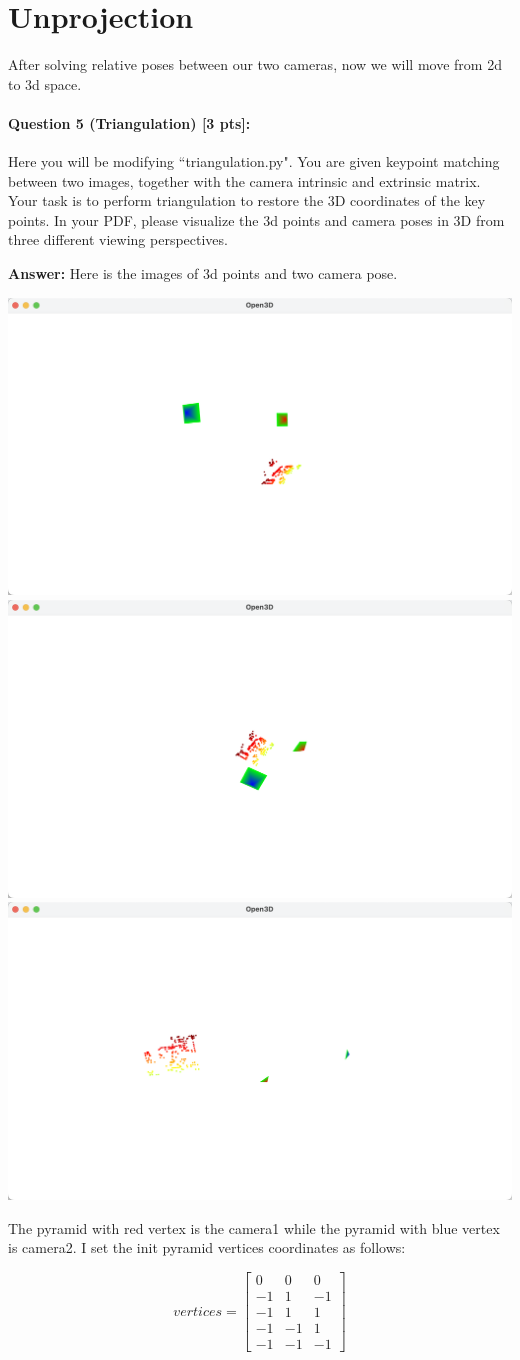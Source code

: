 \documentclass[11pt]{article}
\begin{document}
\section*{Unprojection} 
After solving relative poses between our two cameras, now we will move from 2d to 3d space.

\paragraph{Question 5 (Triangulation) [3 pts]:}
Here you will be modifying ``triangulation.py". You are given keypoint matching between two images, together with the camera intrinsic and extrinsic matrix. Your task is to perform triangulation to restore the 3D coordinates of the key points. In your PDF, please visualize the 3d points and camera poses in 3D from three different viewing perspectives. 

\textbf{Answer: } Here is the images of 3d points and two camera pose.
\begin{center}
    \small
    \includegraphics[width=0.3\linewidth]{fig/q5img1.png}
    \includegraphics[width=0.3\linewidth]{fig/q5img2.png}
    \includegraphics[width=0.3\linewidth]{fig/q5img4.png}
\end{center}

The pyramid with red vertex is the camera1 while the pyramid with blue vertex is camera2. I set the init pyramid vertices coordinates as follows:

\[vertices = 
\left[
\begin{array}{ccc}
    0 & 0 & 0 \\
    -1 & 1 & -1 \\
    -1 & 1 & 1 \\
    -1 & -1 & 1 \\
    -1 & -1 & -1
\end{array}
\right]
\]
\end{document}
